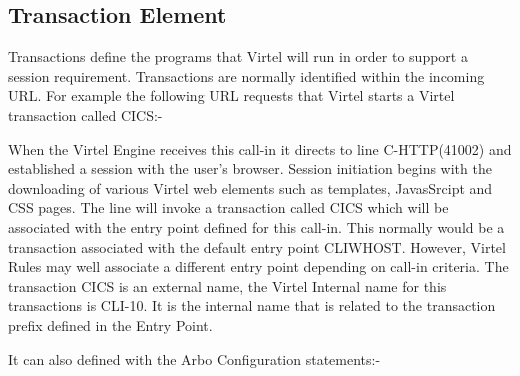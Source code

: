 \documentclass[letterpaper,10pt,english]{sphinxmanual}
\begin{document}
\subsection{Transaction Element}
\label{\detokenize{connectivity_guide:transaction-element}}
Transactions define the programs that Virtel will run in order to support a session requirement. Transactions are normally identified within the incoming URL. For example the following URL requests that Virtel starts a Virtel transaction called CICS:-

\begin{sphinxVerbatim}[commandchars=\\\{\}]
\end{sphinxVerbatim}

When the Virtel Engine receives this call-in it directs to line C-HTTP(41002) and established a session with the user’s browser. Session initiation begins with the downloading of various Virtel web elements such as templates, JavasSrcipt and CSS pages. The line will invoke a transaction called CICS which will be associated with the entry point defined for this call-in. This normally would be a transaction associated with the default entry point CLIWHOST. However, Virtel Rules may well associate a different entry point depending on call-in criteria. The transaction CICS is an external name, the Virtel Internal name for this transactions is CLI-10. It is the internal name that is related to the transaction prefix defined in the Entry Point.


It can also defined with the Arbo Configuration statements:-

\begin{sphinxVerbatim}[commandchars=\\\{\}]
                                      
                                            
                                   
                                           
                                                 
                                         
                                              
\end{sphinxVerbatim}
\end{document}
